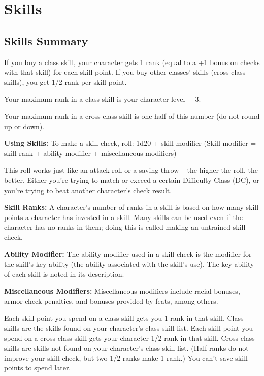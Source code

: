 \chapter{Skills}\label{chapter:Skills}

\section{Skills Summary}

If you buy a class skill, your character gets 1 rank (equal to a +1 bonus on checks 
with that skill) for each skill point. If you buy other classes' skills (cross-class 
skills), you get 1/2 rank per skill point.

Your maximum rank in a class skill is your character level + 3.

Your maximum rank in a cross-class skill is one-half of this number (do not round 
up or down).

\textbf{Using Skills:} To make a skill check, roll: 1d20 + skill modifier (Skill 
modifier = skill rank + ability modifier + miscellaneous modifiers)

This roll works just like an attack roll or a saving throw -- the higher the roll, 
the better. Either you're trying to match or exceed a certain Difficulty Class 
(DC), or you're trying to beat another character's check result.

\textbf{Skill Ranks:} A character's number of ranks in a skill is based on how 
many skill points a character has invested in a skill. Many skills can be used 
even if the character has no ranks in them; doing this is called making an untrained 
skill check.

\textbf{Ability Modifier:} The ability modifier used in a skill check is the modifier 
for the skill's key ability (the ability associated with the skill's use). The 
key ability of each skill is noted in its description.

\textbf{Miscellaneous Modifiers:} Miscellaneous modifiers include racial bonuses, 
armor check penalties, and bonuses provided by feats, among others.

Each skill point you spend on a class skill gets you 1 rank in that skill. Class 
skills are the skills found on your character's class skill list. Each skill point 
you spend on a cross-class skill gets your character 1/2 rank in that skill. Cross-class 
skills are skills not found on your character's class skill list. (Half ranks do 
not improve your skill check, but two 1/2 ranks make 1 rank.) You can't save skill 
points to spend later.

